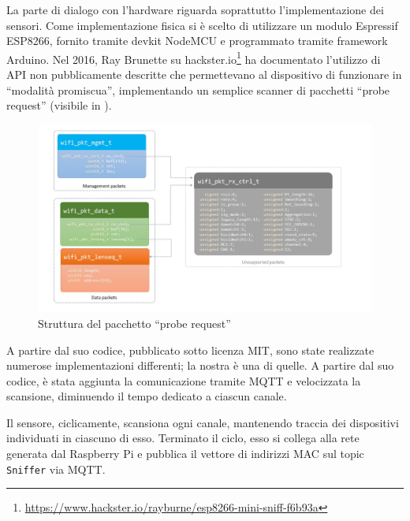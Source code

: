 La parte di dialogo con l'hardware riguarda soprattutto l'implementazione dei sensori.
Come implementazione fisica si è scelto di utilizzare un modulo Espressif ESP8266, fornito tramite devkit NodeMCU e programmato tramite framework Arduino.
Nel 2016, Ray Brunette su hackster.io\footnote{\url{https://www.hackster.io/rayburne/esp8266-mini-sniff-f6b93a}} ha documentato l'utilizzo di API non pubblicamente descritte che permettevano al dispositivo di funzionare in ``modalità promiscua'',
implementando un semplice scanner di pacchetti ``probe request'' (visibile in ).

\begin{figure}[H]
  \centering
  \includegraphics[width=\textwidth]{res/fig/sniffer.jpg}
  \caption{Struttura del pacchetto ``probe request''}%
  \label{fig:probe}
\end{figure}

A partire dal suo codice, pubblicato sotto licenza MIT, sono state realizzate numerose implementazioni differenti;
la nostra è una di quelle.
A partire dal suo codice, è stata aggiunta la comunicazione tramite MQTT e velocizzata la scansione, diminuendo il tempo dedicato a ciascun canale.

Il sensore, ciclicamente, scansiona ogni canale, mantenendo traccia dei dispositivi individuati in ciascuno di esso.
Terminato il ciclo, esso si collega alla rete generata dal Raspberry Pi e pubblica il vettore di indirizzi MAC sul topic \texttt{Sniffer} via MQTT\@.
